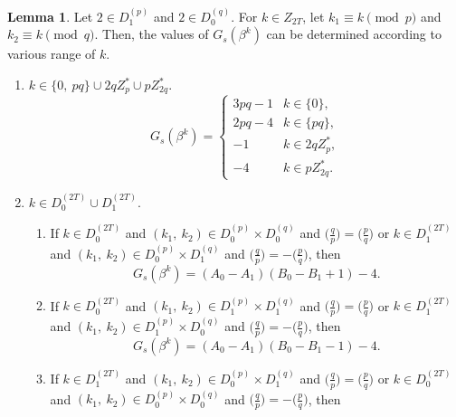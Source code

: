 \documentclass{mcom-l}
\theoremstyle{definition}
\newtheorem{sec3lemma10}[sec3lemma1]{Lemma}
\numberwithin{equation}{section}
\begin{document}
    \begin{sec3lemma10}\label{lab_sec3_lemma10}
    Let $ 2\in  D_{1}^{(p)}$ and $  2\in  D_{0}^{(q)} $. For $ k\in Z_{2T} $, let $ k_{1}\equiv k\pmod p $ and $ k_{2}\equiv k\pmod q $. Then, the values of $ G_{s}(\beta^{k}) $ can be determined according to various range of $ k $.
    \begin{enumerate} \item $ k\in \lbrace 0,\ pq \rbrace \cup 2qZ^{*}_{p}\cup pZ^{*}_{2 q} $.
    \begin{equation*}
    G_{s}(\beta^{k})=
    \begin{cases}
    3pq-1&k\in\lbrace 0\rbrace,\\
    2pq-4&k\in\lbrace pq\rbrace,\\
    -1   &k\in 2qZ^{*}_{p},\\
    -4   &k\in pZ^{*}_{2q}.
    \end{cases}
    \end{equation*}
    \item $ k\in D_{0}^{(2T)}\cup D_{1}^{(2T)} $.
    \begin{enumerate}
    \item
    If $ k\in D_{0}^{(2T)} $ and $ (k_{1},\ k_{2})\in D^{(p)}_{0}\times D^{(q)}_{0} $ and $ \biggl(\frac{q}{p}\biggr)=\biggl(\frac{p}{q}\biggr) $ or $ k\in D_{1}^{(2T)} $ and $ (k_{1},\ k_{2})\in D^{(p)}_{0}\times D^{(q)}_{1} $ and $ \biggl(\frac{q}{p}\biggr)=-\biggl(\frac{p}{q}\biggr) $, then
    \begin{equation*}
    G_{s}(\beta^{k})=(A_{0}-A_{1})(B_{0}-B_{1}+1)-4.
    \end{equation*} 
    \item
    If $ k\in D_{0}^{(2T)} $ and $ (k_{1},\ k_{2})\in D^{(p)}_{1}\times D^{(q)}_{1} $ and $ \biggl(\frac{q}{p}\biggr)=\biggl(\frac{p}{q}\biggr) $ or $ k\in D_{1}^{(2T)} $ and $ (k_{1},\ k_{2})\in D^{(p)}_{1}\times D^{(q)}_{0} $ and $ \biggl(\frac{q}{p}\biggr)=-\biggl(\frac{p}{q}\biggr) $, then
    \begin{equation*}
    G_{s}(\beta^{k})=(A_{0}-A_{1})(B_{0}-B_{1}-1)-4.
    \end{equation*} 
    \item
    If $ k\in D_{1}^{(2T)} $ and $ (k_{1},\ k_{2})\in D^{(p)}_{0}\times D^{(q)}_{1} $ and $ \biggl(\frac{q}{p}\biggr)=\biggl(\frac{p}{q}\biggr) $ or $ k\in D_{0}^{(2T)} $ and $ (k_{1},\ k_{2})\in D^{(p)}_{0}\times D^{(q)}_{0} $ and $ \biggl(\frac{q}{p}\biggr)=-\biggl(\frac{p}{q}\biggr) $, then
    \begin{equation*}

\end{equation*}
\end{enumerate}
\end{enumerate}
\end{sec3lemma10}
\end{document}

